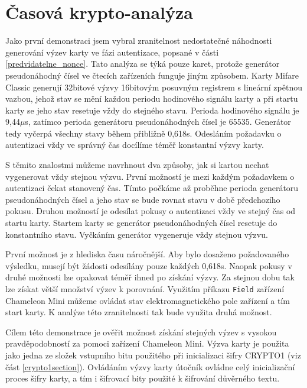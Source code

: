 \section{Časová krypto-analýza}
\label{casovaKryptoanalyza}
Jako první demonstraci jsem vybral zranitelnost nedostatečné náhodnosti generování výzev karty ve fázi autentizace, popsané v části \ref{predvidatelne_nonce}. Tato analýza se týká pouze karet, protože generátor pseudonáhodný čísel ve čtecích zařízeních funguje jiným způsobem. Karty Mifare Classic generují 32bitové výzvy 16bitovým posuvným registrem s lineární zpětnou vazbou, jehož stav se mění každou periodu hodinového signálu karty a při startu karty se jeho stav resetuje vždy do stejného stavu. Perioda hodinového signálu je 9,44$\mu$s, zatímco perioda generátoru pseudonáhodných čísel je 65535. Generátor tedy vyčerpá všechny stavy během přibližně 0,618s. Odesláním požadavku o autentizaci vždy ve správný čas docílíme téměř konstantní výzvy karty. \par
S těmito znalostmi můžeme navrhnout dva způsoby, jak si kartou nechat vygenerovat vždy stejnou výzvu. První možností je mezi každým požadavkem o autentizaci čekat stanovený čas. Tímto počkáme až proběhne perioda generátoru pseudonáhodných čísel a jeho stav se bude rovnat stavu v době předchozího pokusu. Druhou možností je odesílat pokusy o autentizaci vždy ve stejný čas od startu karty. Startem karty se generátor pseudonáhodných čísel resetuje do konstantního stavu. Vyčkáním generátor vygeneruje vždy stejnou výzvu.\par
První možnost je z hlediska času náročnější. Aby bylo dosaženo požadovaného výsledku, musejí být žádosti odesílány pouze každých 0,618s. Naopak pokusy v druhé možnosti lze opakovat téměř ihned po získání výzvy. Za stejnou dobu tak lze získat větší množství výzev k porovnání. Využitím příkazu \verb|Field| zařízení Chameleon Mini můžeme ovládat stav elektromagnetického pole zařízení a tím start karty. K analýze této zranitelnosti tak bude využita druhá možnost.\par
Cílem této demonstrace je ověřit možnost získání stejných výzev s vysokou pravděpodobností za pomoci zařízení Chameleon Mini. Výzva karty je použita jako jedna ze složek vstupního bitu použitého při inicializaci šifry CRYPTO1 (viz část \ref{crypto1section}). Ovládáním výzvy karty útočník ovládne celý inicializační proces šifry karty, a tím i šifrovací bity použité k šifrování důvěrného textu. \par
